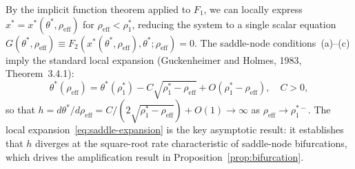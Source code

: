By the implicit function theorem applied to $F_1$, we can locally express $x^* = x^*(\theta^*, \rho_{\text{eff}})$ for $\rho_{\text{eff}} < \rho_1^*$, reducing the system to a single scalar equation $G(\theta^*, \rho_{\text{eff}}) \equiv F_2(x^*(\theta^*, \rho_{\text{eff}}), \theta^*; \rho_{\text{eff}}) = 0$. The saddle-node conditions~(a)--(c) imply the standard local expansion (Guckenheimer and Holmes, 1983, Theorem~3.4.1):
\begin{equation}\label{eq:saddle-expansion}
  \theta^*(\rho_{\text{eff}}) = \theta^*(\rho_1^*) - C\sqrt{\rho_1^* - \rho_{\text{eff}}} + O(\rho_1^* - \rho_{\text{eff}}), \quad C > 0,
\end{equation}
so that $h = d\theta^*/d\rho_{\text{eff}} = C/(2\sqrt{\rho_1^* - \rho_{\text{eff}}}) + O(1) \to \infty$ as $\rho_{\text{eff}} \to \rho_1^{*-}$. The local expansion~\eqref{eq:saddle-expansion} is the key asymptotic result: it establishes that $h$ diverges at the square-root rate characteristic of saddle-node bifurcations, which drives the amplification result in Proposition~\ref{prop:bifurcation}.
